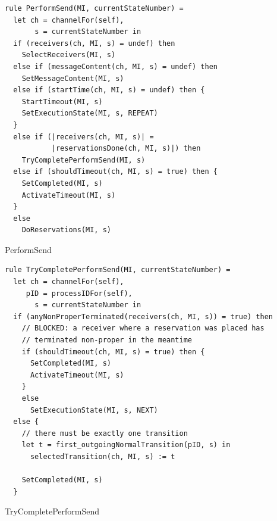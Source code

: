 \begin{listing}[H]
\begin{verbatim}
rule PerformSend(MI, currentStateNumber) =
  let ch = channelFor(self),
       s = currentStateNumber in
  if (receivers(ch, MI, s) = undef) then
    SelectReceivers(MI, s)
  else if (messageContent(ch, MI, s) = undef) then
    SetMessageContent(MI, s)
  else if (startTime(ch, MI, s) = undef) then {
    StartTimeout(MI, s)
    SetExecutionState(MI, s, REPEAT)
  }
  else if (|receivers(ch, MI, s)| =
           |reservationsDone(ch, MI, s)|) then
    TryCompletePerformSend(MI, s)
  else if (shouldTimeout(ch, MI, s) = true) then {
    SetCompleted(MI, s)
    ActivateTimeout(MI, s)
  }
  else
    DoReservations(MI, s)
\end{verbatim}
\caption{PerformSend}
\label{lst:asm:PerformSend}
\end{listing}




\begin{listing}[H]
\begin{verbatim}
rule TryCompletePerformSend(MI, currentStateNumber) =
  let ch = channelFor(self),
     pID = processIDFor(self),
       s = currentStateNumber in
  if (anyNonProperTerminated(receivers(ch, MI, s)) = true) then
    // BLOCKED: a receiver where a reservation was placed has
    // terminated non-proper in the meantime
    if (shouldTimeout(ch, MI, s) = true) then {
      SetCompleted(MI, s)
      ActivateTimeout(MI, s)
    }
    else
      SetExecutionState(MI, s, NEXT)
  else {
    // there must be exactly one transition
    let t = first_outgoingNormalTransition(pID, s) in
      selectedTransition(ch, MI, s) := t

    SetCompleted(MI, s)
  }
\end{verbatim}
\caption{TryCompletePerformSend}
\label{lst:asm:TryCompletePerformSend}
\end{listing}




